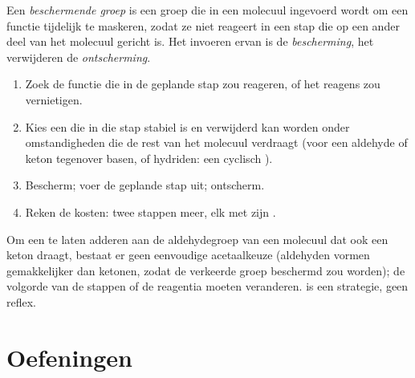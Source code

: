 \begin{definition}\label{def:b1:acetals-protection:protecting-group}
Een \emph{beschermende groep} is een groep die
in een molecuul ingevoerd wordt om een functie tijdelijk te maskeren,
zodat ze niet reageert in een stap die op een ander deel van het molecuul
gericht is. Het invoeren ervan is de
\emph{bescherming}, het verwijderen de
\emph{ontscherming}.
\end{definition}

\begin{method}\label{met:b1:acetals-protection:protect}
\begin{enumerate}
  \item Zoek de functie die in de geplande stap zou reageren, of het
        reagens zou vernietigen.
  \item Kies een  die in die stap stabiel is en
        verwijderd kan worden onder omstandigheden die de rest van het
        molecuul verdraagt (voor een aldehyde of keton tegenover basen,
         of hydriden: een cyclisch ).
  \item Bescherm; voer de geplande stap uit; ontscherm.
  \item Reken de kosten: twee stappen meer, elk met zijn .
\end{enumerate}
\end{method}

\begin{example}\label{ex:b1:acetals-protection:ketoester}
Om een  te laten adderen aan de aldehydegroep van een
molecuul dat ook een keton draagt, bestaat er geen eenvoudige
acetaalkeuze (aldehyden vormen gemakkelijker  dan ketonen, zodat
de verkeerde groep beschermd zou worden); de volgorde van de stappen of
de reagentia moeten veranderen.  is een strategie, geen
reflex.
\end{example}

\section{Oefeningen}

